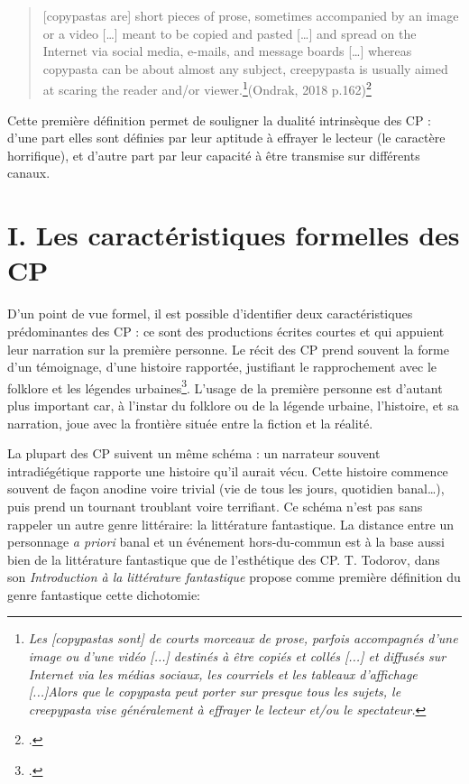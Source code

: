 \documentclass[12pt,a4paper,oneside,titlepage]{article} %
\begin{document}
\begin{quotation}
	[copypastas are] short pieces of prose, sometimes accompanied by an image or a video […] meant to be copied
			and pasted […] and spread on the Internet via social media, e-mails, and message boards […]
			whereas copypasta can be about almost any subject, creepypasta is usually aimed at scaring
			the reader and/or viewer.\footnote{\emph{Les [copypastas sont] de courts morceaux de prose, parfois accompagnés d'une image ou d'une vidéo [...] destinés à être copiés et collés [...] et diffusés sur Internet via les médias sociaux, les courriels et les tableaux d'affichage [...]Alors que le copypasta peut porter sur presque tous les sujets, le creepypasta vise généralement à effrayer le lecteur et/ou le spectateur.}}(Ondrak, 2018 p.162)\footcite{ondrak_spectres_2018}
\end{quotation}
	\par
	Cette première définition permet de souligner la dualité intrinsèque des CP : d'une part elles sont définies par leur aptitude à effrayer le lecteur (le caractère horrifique), et d'autre part par leur capacité à être transmise sur différents canaux. 
	
\section*{I.	Les caractéristiques formelles des CP}
	
\par
D’un point de vue formel, il est possible d’identifier deux caractéristiques prédominantes des CP : ce sont des productions écrites courtes et qui appuient leur narration sur la première personne. Le récit des CP prend souvent la forme d’un témoignage, d’une histoire rapportée, justifiant le rapprochement avec le folklore et les légendes urbaines\footcite{blank_slender_2018}. L’usage de la première personne est d’autant plus important car, à l’instar du folklore ou de la légende urbaine, l’histoire, et sa narration, joue avec la frontière située entre la fiction et la réalité. 
\par
La plupart des CP suivent un même schéma : un narrateur souvent intradiégétique rapporte une histoire qu’il aurait vécu. Cette histoire commence souvent de façon anodine voire trivial (vie de tous les jours, quotidien banal…), puis prend un tournant troublant voire terrifiant. 
Ce schéma n’est pas sans rappeler un autre genre littéraire: la littérature fantastique. La distance entre un personnage \emph{a priori} banal et un événement hors-du-commun est à la base aussi bien de la littérature fantastique que de l’esthétique des CP. \newline
T. Todorov, dans son \emph{Introduction à la littérature fantastique} propose comme première définition du genre fantastique cette dichotomie: 
\end{document}
